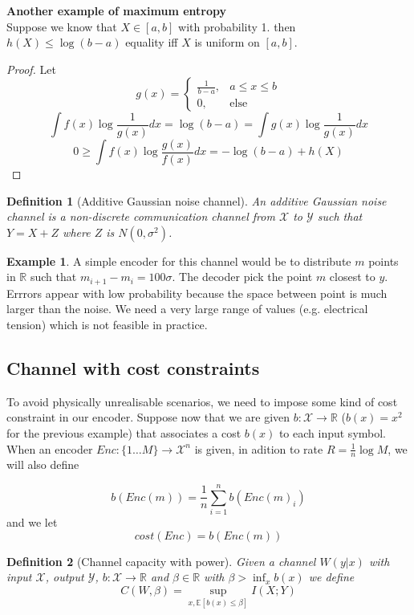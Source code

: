\documentclass[twoside]{article}
\newtheorem{definition}{Definition}[section]
\theoremstyle{definition} %
\newtheorem{example}{Example}
\newcommand{\Ex}[1]{\mathbb{E}\left[#1\right]}
\def\X{\mathcal{X}}
\def\Y{\mathcal{Y}}
\def\R{\mathbb{R}}
\begin{document}
\textbf{Another example of maximum entropy} \\
Suppose we know that $X \in [a, b]$ with probability 1. then $h(X) \leq \log(b - a)$ equality iff $X$ is uniform on $[a, b]$.
\begin{proof}
  Let
  \[
    g(x) =
    \left\{
    \begin{array}{cc}
      \frac{1}{b - a} , & a \leq x \leq b \\
      0 , & \text{else}
    \end{array}
    \right.
\]
\[
  \int f(x) \log \frac{1}{g(x)} dx = \log(b - a) = \int g(x) \log \frac{1}{g(x)} dx
\]
\[
  0 \geq \int f(x) \log \frac{g(x)}{f(x)} dx = - \log(b - a) + h(X)
\]
\end{proof}


\begin{definition}[Additive Gaussian noise channel]
  An additive Gaussian noise channel is a non-discrete communication channel from $\X$ to $\Y$ such that $Y=X+Z$ where $Z$ is $N(0,\sigma^2)$.
\end{definition}

\begin{example}
  A simple encoder for this channel would be to distribute $m$ points in $\R$ such that $m_{i+1} - m_i = 100\sigma$. The decoder pick the point $m$ closest to $y$. Errrors appear with low probability because the space between point is much larger than the noise. We need a very large range of values (e.g. electrical tension) which is not feasible in practice.
\end{example}

\subsection{Channel with cost constraints}

To avoid physically unrealisable scenarios, we need to impose some kind of cost constraint in our encoder. Suppose now that we are given $b : \X \to \R$ ($b(x) = x^2$ for the previous example) that associates a cost $b(x)$ to each input symbol. When an encoder $Enc: \{ 1 \dots M \} \to \X^n$ is given, in adition to rate $R = \frac 1 n \log M$, we will also define

\[
  b(Enc(m)) = \frac 1 n \sum_{i=1}^n b(Enc(m)_i)
\]
and we let
\[
  cost(Enc) = b(Enc(m))
\]

\begin{definition}[Channel capacity with power]
Given a channel $W(y|x)$ with input $\X$, output $\Y$, $b:\X\to \R$ and $\beta \in \R$ with $\beta > \inf_x b(x)$ we define
\[
  C(W, \beta) = \sup_{x, \Ex{b(x) \leq \beta}} I(X;Y)
\]
\end{definition}
\end{document}

